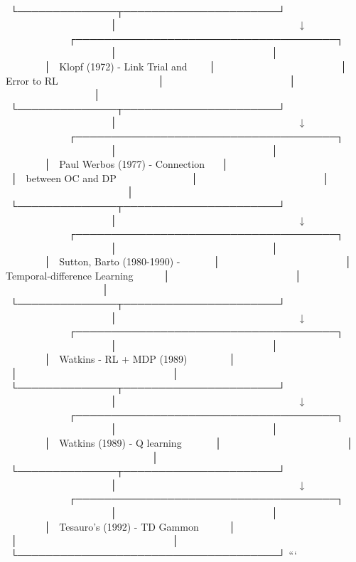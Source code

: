                              └──────────────┬──────────────────────┘
                                           │
                                           ↓
                             ┌─────────────────────────────────────┐
                             │                                     │
                             │  Klopf (1972) - Link Trial and     │
                             │  Error to RL                        │
                             │                                     │
                             └──────────────┬──────────────────────┘
                                           │
                                           ↓
                             ┌─────────────────────────────────────┐
                             │                                     │
                             │  Paul Werbos (1977) - Connection    │
                             │  between OC and DP                  │
                             │                                     │
                             └──────────────┬──────────────────────┘
                                           │
                                           ↓
                             ┌─────────────────────────────────────┐
                             │                                     │
                             │  Sutton, Barto (1980-1990) -        │
                             │  Temporal-difference Learning       │
                             │                                     │
                             └──────────────┬──────────────────────┘
                                           │
                                           ↓
                             ┌─────────────────────────────────────┐
                             │                                     │
                             │  Watkins - RL + MDP (1989)          │
                             │                                     │
                             └──────────────┬──────────────────────┘
                                           │
                                           ↓
                             ┌─────────────────────────────────────┐
                             │                                     │
                             │  Watkins (1989) - Q learning        │
                             │                                     │
                             └──────────────┬──────────────────────┘
                                           │
                                           ↓
                             ┌─────────────────────────────────────┐
                             │                                     │
                             │  Tesauro's (1992) - TD Gammon       │
                             │                                     │
                             └─────────────────────────────────────┘
```

